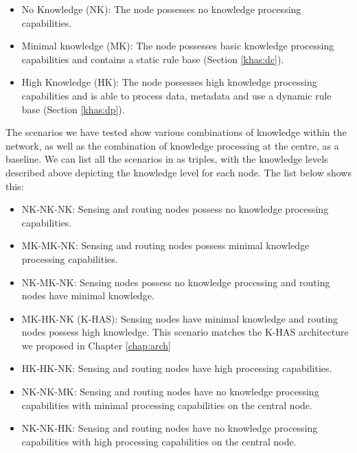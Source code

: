 	\begin{itemize}
		\item No Knowledge (NK): The node possesses no knowledge processing capabilities.
		\item Minimal knowledge (MK): The node possesses basic knowledge processing capabilities and contains a static rule base (Section \ref{khas:dc}).
		\item High Knowledge (HK): The node possesses high knowledge processing capabilities and is able to process data, metadata and use a dynamic rule base (Section \ref{khas:dp}).
	\end{itemize}

The scenarios we have tested show various combinations of knowledge within the network, as well as the combination of knowledge processing at the centre, as a baseline. We can list all the scenarios in as triples, with the knowledge levels described above depicting the knowledge level for each node. The list below shows this:

	\begin{itemize}
		\item NK-NK-NK: Sensing and routing nodes possess no knowledge processing capabilities.
		\item MK-MK-NK: Sensing and routing nodes possess minimal knowledge processing capabilities.
		\item NK-MK-NK: Sensing nodes possess no knowledge processing and routing nodes have minimal knowledge.
		\item MK-HK-NK (K-HAS): Sensing nodes have minimal knowledge and routing nodes possess high knowledge. This scenario matches the K-HAS architecture we proposed in Chapter \ref{chap:arch}
		\item HK-HK-NK: Sensing and routing nodes have high processing capabilities.
		\item NK-NK-MK: Sensing and routing nodes have no knowledge processing capabilities with minimal processing capabilities on the central node.
		\item NK-NK-HK: Sensing and routing nodes have no knowledge processing capabilities with high processing capabilities on the central node.
	\end{itemize}


